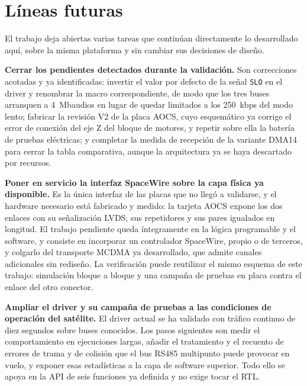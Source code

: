 \section{Líneas futuras}

El trabajo deja abiertas varias tareas que continúan directamente lo desarrollado aquí, sobre la
misma plataforma y sin cambiar sus decisiones de diseño.

\textbf{Cerrar los pendientes detectados durante la validación.} Son correcciones acotadas y ya
identificadas: invertir el valor por defecto de la señal \texttt{SLO} en el driver y renombrar la
macro correspondiente, de modo que los tres buses arranquen a 4~Mbaudios en lugar de quedar limitados
a los 250~kbps del modo lento; fabricar la revisión V2 de la placa AOCS, cuyo esquemático ya
corrige el error de conexión del eje Z del bloque de motores, y repetir sobre ella la batería de
pruebas eléctricas; y completar la medida de recepción de la variante DMA14 para cerrar la tabla
comparativa, aunque la arquitectura ya se haya descartado por recursos.

\textbf{Poner en servicio la interfaz SpaceWire sobre la capa física ya disponible.} Es la única
interfaz de las placas que no llegó a validarse, y el hardware necesario está fabricado y medido:
la tarjeta AOCS expone los dos enlaces con su señalización LVDS, sus repetidores y sus pares
igualados en longitud. El trabajo pendiente queda íntegramente en la lógica programable y el
software, y consiste en incorporar un controlador SpaceWire, propio o de terceros, y colgarlo del
transporte MCDMA ya desarrollado, que admite canales adicionales sin rediseño. La verificación
puede reutilizar el mismo esquema de este trabajo: simulación bloque a bloque y una campaña de
pruebas en placa contra el enlace del otro conector.

\textbf{Ampliar el driver y su campaña de pruebas a las condiciones de operación del satélite.}
El driver actual se ha validado con tráfico continuo de diez segundos sobre buses conocidos. Los
pasos siguientes son medir el comportamiento en ejecuciones largas, añadir el tratamiento y el
recuento de errores de trama y de colisión que el bus RS485 multipunto puede provocar en vuelo, y
exponer esas estadísticas a la capa de software superior. Todo ello se apoya en la API de seis
funciones ya definida y no exige tocar el RTL.

